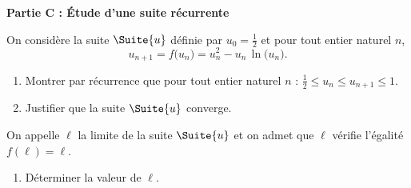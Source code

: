 \smallskip

\textbf{Partie C : Étude d'une suite récurrente}

\medskip

On considère la suite $\Suite{u}$ définie par $u_0=\frac12$ et pour tout entier naturel $n$, \[ u_{n+1} = f\big(u_n\big)=u_n^2-u_n\,\ln\big(u_n\big). \]

\begin{enumerate}
	\item Montrer par récurrence que pour tout entier naturel $n$ : $\frac12 \leqslant u_n \leqslant u_{n+1} \leqslant 1$.
	\item Justifier que la suite $\Suite{u}$ converge.
\end{enumerate}

On appelle $\ell$ la limite de la suite $\Suite{u}$ et on admet que $\ell$ vérifie l'égalité $f(\ell) =\ell$.

\begin{enumerate}[resume]
	\item Déterminer la valeur de $\ell$.
\end{enumerate}